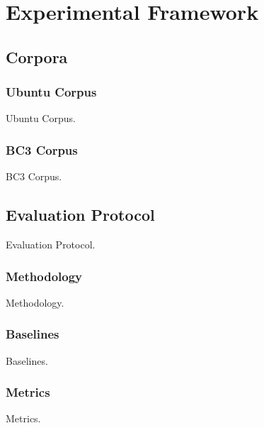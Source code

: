 
\chapter{Experimental Framework}

\section{Corpora}

\subsection{Ubuntu Corpus}

Ubuntu Corpus.

\subsection{BC3 Corpus}

BC3 Corpus.

\section{Evaluation Protocol}

Evaluation Protocol.

\subsection{Methodology}

Methodology.

\subsection{Baselines}

Baselines.

\subsection{Metrics}

Metrics.